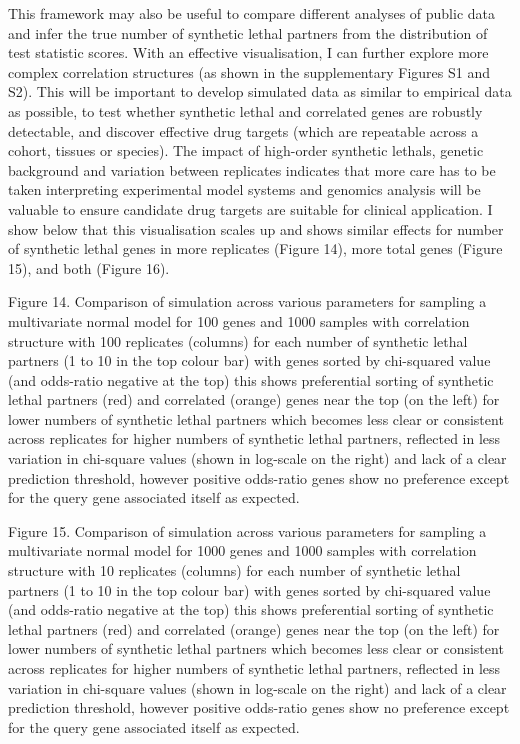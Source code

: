 This framework may also be useful to compare different analyses of public data and infer the true number of \gls{synthetic lethal} partners from the distribution of test statistic scores.  With an effective visualisation, I can further explore more complex correlation structures (as shown in the supplementary Figures S1 and S2).  This will be important to develop simulated data as similar to empirical data as possible, to test whether \gls{synthetic lethal} and correlated genes are robustly detectable, and discover effective drug targets (which are repeatable across a cohort, tissues or species).  The impact of high-order \glspl{synthetic lethal}, genetic background and variation between replicates indicates that more care has to be taken interpreting experimental model systems and \glspl{genomic} analysis will be valuable to ensure candidate drug targets are suitable for clinical application.  I show below that this visualisation scales up and shows similar effects for number of \gls{synthetic lethal} genes in more replicates (Figure 14), more total genes (Figure 15), and both (Figure 16).
    
Figure 14.  Comparison of simulation across various parameters for sampling a multivariate normal model for 100 genes and 1000 samples with correlation structure with 100 replicates (columns) for each number of \gls{synthetic lethal} partners (1 to 10 in the top colour bar) with genes sorted by chi-squared value (and odds-ratio negative at the top) this shows preferential sorting of \gls{synthetic lethal} partners (red) and correlated (orange) genes near the top (on the left) for lower numbers of \gls{synthetic lethal} partners which becomes less clear or consistent across replicates for higher numbers of \gls{synthetic lethal} partners, reflected in less variation in chi-square values (shown in log-scale on the right) and lack of a clear prediction threshold, however positive odds-ratio genes show no preference except for the query gene associated itself as expected.  
   
Figure 15.  Comparison of simulation across various parameters for sampling a multivariate normal model for 1000 genes and 1000 samples with correlation structure with 10 replicates (columns) for each number of \gls{synthetic lethal} partners (1 to 10 in the top colour bar) with genes sorted by chi-squared value (and odds-ratio negative at the top) this shows preferential sorting of \gls{synthetic lethal} partners (red) and correlated (orange) genes near the top (on the left) for lower numbers of \gls{synthetic lethal} partners which becomes less clear or consistent across replicates for higher numbers of \gls{synthetic lethal} partners, reflected in less variation in chi-square values (shown in log-scale on the right) and lack of a clear prediction threshold, however positive odds-ratio genes show no preference except for the query gene associated itself as expected.
    
